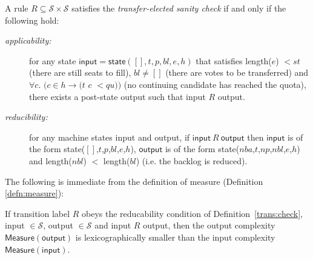 \documentclass{llncs}
\begin{document}
\begin{definition}\label{trans:check}
A rule $R \subseteq \mathcal{S} \times \mathcal{S}$ satisfies the
\emph{transfer-elected sanity check}  if and only if the following
hold:
\begin{description}
\item[\it applicability:] for any state 
$\mathsf{input} = \mathsf{state}([],t,p,bl,e,h)$ that satisfies 
\textsf{length}($e$) $< st$  (there are still seats to fill), $bl
\neq []$ (there are votes to be transferred) and 
$\forall c.$ $(c \in h \rightarrow (t$ $c$ $< qu))$  (no continuing candidate
has reached the quota), there exists a post-state 
\textsf{output} such that \textsf{input} $R$ \textsf{output}.

\item[\it reducibility:] for any machine states \textsf{input} and
\textsf{output}, if 
$\mathsf{input} ~R~ \mathsf{output}$ then
$\mathsf{input}$ is of the form 
\textsf{state}($[]$,$t$,$p$,$bl$,$e$,$h$), $\mathsf{output}$ is of
the form 
\textsf{state}($nba$,$t$,$np$,$nbl$,$e$,$h$) and \textsf{length}($nbl$)
$<$ \textsf{length}($bl$) (i.e. the backlog is reduced). 
\end{description}
\end{definition}

\noindent
The following is immediate from the definition of measure
(Definition \ref{defn:measure}):
\begin{theorem}\label{trans:red}
If transition label $R$ obeys the reducability
condition of Definition~\ref{trans:check},
\textsf{input} $\in\mathcal{S}$, 
\textsf{output} $\in\mathcal{S}$ and \textsf{input}
$R$ \textsf{output},
then the \textsf{output} complexity 
$\mathsf{Measure}(\mathsf{output})$
is lexicographically smaller than
the \textsf{input} complexity
$\mathsf{Measure}(\mathsf{input})$.
\end{theorem}
\end{document}

